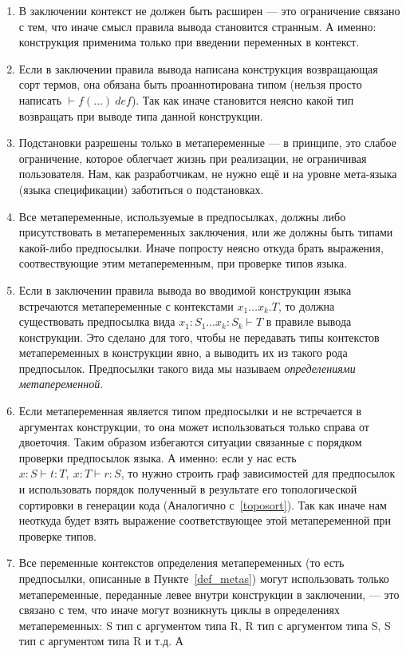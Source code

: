 \begin{enumerate}
\item В заключении контекст не должен быть расширен --- это ограничение связано с тем, что иначе смысл правила вывода становится странным. А именно: конструкция применима только при введении переменных в контекст.

\item Если в заключении правила вывода написана конструкция возвращающая сорт термов, она обязана быть проаннотирована типом (нельзя просто написать $ \vdash f(\ldots)\ def$). Так как иначе становится неясно какой тип возвращать при выводе типа данной конструкции.

\item Подстановки разрешены только в метапеременные --- в принципе, это слабое ограничение, которое облегчает жизнь при реализации, не ограничивая пользователя. Нам, как разработчикам, не нужно ещё и на уровне мета-языка (языка спецификации) заботиться о подстановках.

\item \label{tm:Meta} Все метапеременные, используемые в предпосылках, должны либо присутствовать в метапеременных заключения, или же должны быть типами какой-либо предпосылки. Иначе попросту неясно откуда брать выражения, соотвествующие этим метапеременным, при проверке типов языка.

\item \label{def_metas} Если в заключении правила вывода во вводимой конструкции языка встречаются метапеременные с контекстами $x_1 \ldots x_k . T$, то должна существовать предпосылка вида $x_1 : S_1 \ldots x_k : S_k  \vdash T$ в правиле вывода конструкции. Это сделано для того, чтобы не передавать типы контекстов метапеременных в конструкции явно, а выводить их из такого рода предпосылок. Предпосылки такого вида мы называем \textit{определениями метапеременной}.

\item \label{right::} Если метапеременная является типом предпосылки и не встречается в аргументах конструкции, то она может использоваться только справа от двоеточия. Таким образом избегаются ситуации связанные с порядком проверки предпосылок языка. А именно: если у нас есть $x : S \vdash t : T,\ x:T \vdash r : S$, то нужно строить граф зависимостей для предпосылок и использовать порядок полученный в результате его топологической сортировки в генерации кода (Аналогично с~\ref{toposort}). Так как иначе нам неоткуда будет взять выражение соответствующее этой метапеременной при проверке типов.

\item \label{order:Meta} Все переменные контекстов определения метапеременных (то есть предпосылки, описанные в Пункте~\ref{def_metas}) могут использовать только метапеременные, переданные левее внутри конструкции в заключении, --- это связано с тем, что иначе могут возникнуть циклы в определениях метапеременных: S тип с аргументом типа R, R тип с аргументом типа S, S тип с аргументом типа R и т.д. А


\end{enumerate}
